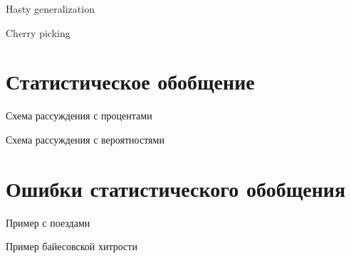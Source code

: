 \documentclass[aspectratio=169]{beamer}
\begin{document}
\begin{frame}
Hasty generalization
\end{frame}


\begin{frame}
Cherry picking
\end{frame}

\begin{frame}
\begin{Reason}
\end{Reason}
\end{frame}

\section{Статистическое обобщение}

\begin{frame}
Схема рассуждения с процентами
\end{frame}

\begin{frame}
Схема рассуждения с вероятностями
\end{frame}

\section{Ошибки статистического обобщения}

\begin{frame}
Пример с поездами
\end{frame}

\begin{frame}
Пример байесовской хитрости
\end{frame}
\end{document}
